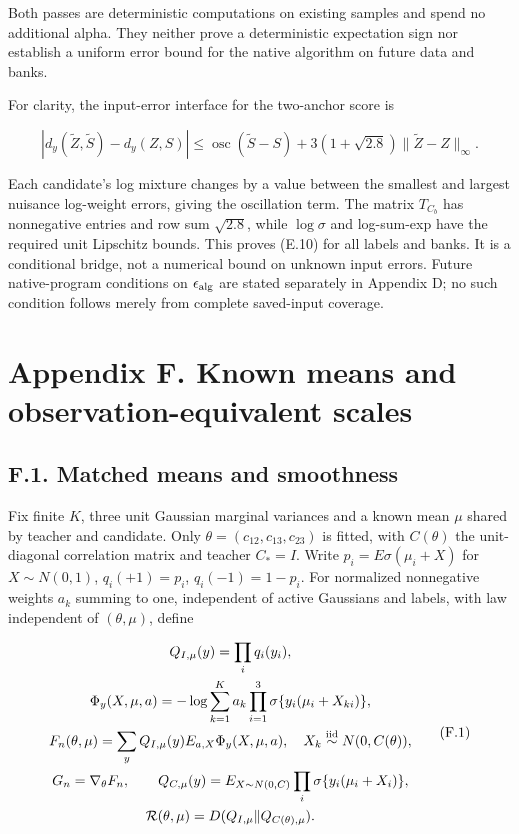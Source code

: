 \documentclass{article}
\begin{document}
Both passes are deterministic computations on existing samples and spend
no additional alpha. They neither prove a deterministic expectation sign
nor establish a uniform error bound for the native algorithm on future
data and banks.

For clarity, the input-error interface for the two-anchor score is

\[
|d_y(\widetilde Z,\widetilde S)-d_y(Z,S)|
\le\operatorname{osc}(\widetilde S-S)
+3(1+\sqrt{2.8})\|\widetilde Z-Z\|_\infty.
\tag{E.10}
\]

Each candidate's log mixture changes by a value between the smallest and
largest nuisance log-weight errors, giving the oscillation term. The
matrix \(T_{C_b}\) has nonnegative entries and row sum \(\sqrt{2.8}\),
while \(\log\sigma\) and log-sum-exp have the required unit Lipschitz
bounds. This proves (E.10) for all labels and banks. It is a conditional
bridge, not a numerical bound on unknown input errors. Future
native-program conditions on \(\epsilon_{\rm alg}\) are stated
separately in Appendix D; no such condition follows merely from complete
saved-input coverage.

\clearpage

\section*{Appendix F. Known means and observation-equivalent
scales}\label{appendix-f.-known-means-and-observation-equivalent-scales}

\subsection*{F.1. Matched means and
smoothness}\label{f.1.-matched-means-and-smoothness}

Fix finite \(K\), three unit Gaussian marginal variances and a known
mean \(\mu\) shared by teacher and candidate. Only
\(\theta=(c_{12},c_{13},c_{23})\) is fitted, with \(C(\theta)\) the
unit-diagonal correlation matrix and teacher \(C_*=I\). Write
\(p_i=E\sigma(\mu_i+X)\) for \(X\sim N(0,1)\), \(q_i(+1)=p_i\),
\(q_i(-1)=1-p_i\). For normalized nonnegative weights \(a_k\) summing to
one, independent of active Gaussians and labels, with law independent of
\((\theta,\mu)\), define

\[
\begin{gathered}
Q_{I,\mu}(y)=\prod_iq_i(y_i),\\
\Phi_y(X,\mu,a)=-\log\sum_{k=1}^Ka_k\prod_{i=1}^3\sigma\{y_i(\mu_i+X_{ki})\},\\
F_n(\theta,\mu)=\sum_yQ_{I,\mu}(y)E_{a,X}\Phi_y(X,\mu,a),\quad X_k\stackrel{\rm iid}{\sim}N(0,C(\theta)),\\
G_n=\nabla_\theta F_n,\qquad
Q_{C,\mu}(y)=E_{X\sim N(0,C)}\prod_i\sigma\{y_i(\mu_i+X_i)\},\\
\mathcal R(\theta,\mu)=D(Q_{I,\mu}\Vert Q_{C(\theta),\mu}).
\end{gathered}
\tag{F.1}
\]
\end{document}
